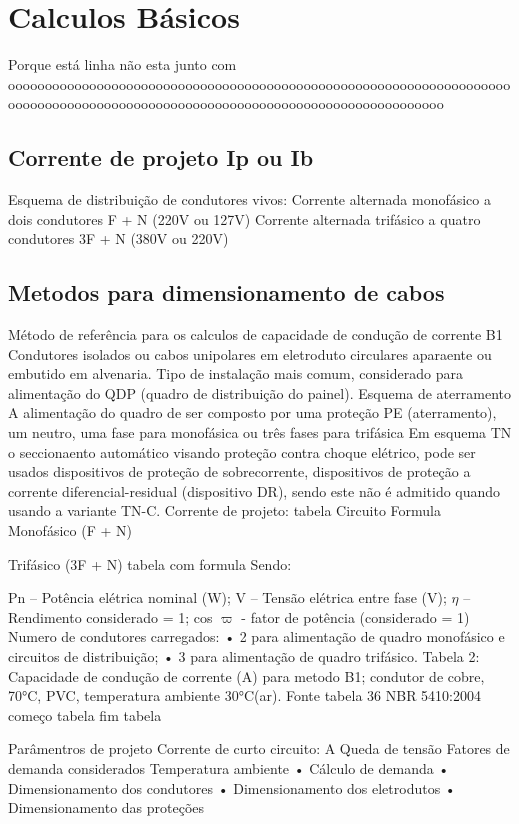 \section{Calculos Básicos}
Porque está linha não esta junto com ooooooooooooooooooooooooooooooooooooooooooooooooooooooooooooooooooooooooooooooooooooooooooooooooooooooooooooooooooooooooooooooo

\subsection{Corrente de projeto Ip ou Ib}

Esquema de distribuição de condutores vivos:
Corrente alternada monofásico a dois condutores F + N (220V ou 127V)
Corrente alternada trifásico a quatro condutores 3F + N (380V ou 220V)

\subsection{Metodos para dimensionamento de cabos}
 
 Método de referência para os calculos de capacidade de condução de corrente
B1 
Condutores isolados ou cabos unipolares em eletroduto circulares aparaente ou embutido em alvenaria. Tipo de instalação mais comum, considerado para alimentação do QDP (quadro de distribuição do painel).
Esquema de aterramento
A alimentação do quadro de ser composto por uma proteção PE (aterramento), um neutro,  uma fase para monofásica ou três fases para trifásica
Em esquema TN o seccionaento automático visando proteção contra choque elétrico, pode ser usados dispositivos de proteção de sobrecorrente, dispositivos de proteção a corrente diferencial-residual (dispositivo DR), sendo este não é admitido quando usando a variante TN-C. 
Corrente de projeto: 
tabela
Circuito
Formula
Monofásico (F + N)

Trifásico (3F + N)
tabela com formula 
Sendo:

Pn – Potência elétrica nominal (W);
V – Tensão elétrica entre fase (V);
$\eta$ – Rendimento considerado = 1; 
cos $\varpi$ -  fator de potência (considerado = 1)
Numero de condutores carregados:
    • 2 para alimentação de quadro monofásico e circuitos de distribuição; 
    • 3 para alimentação de quadro trifásico.
Tabela 2: Capacidade de condução de corrente (A) para metodo B1; condutor de cobre, 70°C, PVC, temperatura ambiente 30°C(ar). Fonte tabela 36 NBR 5410:2004
começo tabela
fim tabela

    Parâmentros de projeto
        Corrente de curto circuito:   A
        Queda de tensão
        Fatores de demanda considerados
        Temperatura ambiente
    • Cálculo de demanda
    • Dimensionamento dos condutores
    • Dimensionamento dos eletrodutos
    • Dimensionamento das proteções
